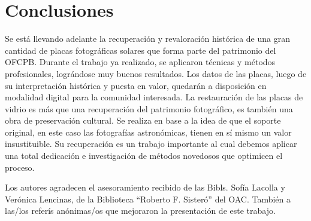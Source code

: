 \documentclass[baaa]{baaa}
\begin{document}
\section{Conclusiones}\label{sec:concl}

Se está llevando adelante la recuperación y revaloración histórica de una gran cantidad de placas fotográficas solares que forma parte del patrimonio del OFCPB.
Durante el trabajo ya realizado, se aplicaron técnicas y métodos profesionales, lográndose muy buenos resultados. Los datos de las placas, luego de su interpretación histórica y puesta en valor, quedarán a disposición en modalidad digital para la comunidad interesada.
La restauración de las placas de vidrio es más que una recuperación del patrimonio fotográfico, es también una obra de preservación cultural.
Se realiza en base a la idea de que el soporte original, en este caso las fotografías astronómicas, tienen en sí mismo un valor insustituible.
Su recuperación es un trabajo importante al cual debemos aplicar una total dedicación e investigación de métodos novedosos que optimicen el proceso.

\begin{acknowledgement}
Los autores agradecen el asesoramiento recibido de las Bibls. Sofía Lacolla y Verónica Lencinas, de la Biblioteca ``Roberto F. Sisteró'' del OAC. También a las/los referís anónimas/os que mejoraron la presentación de este trabajo.
\end{acknowledgement}



\small

 
\end{document}
